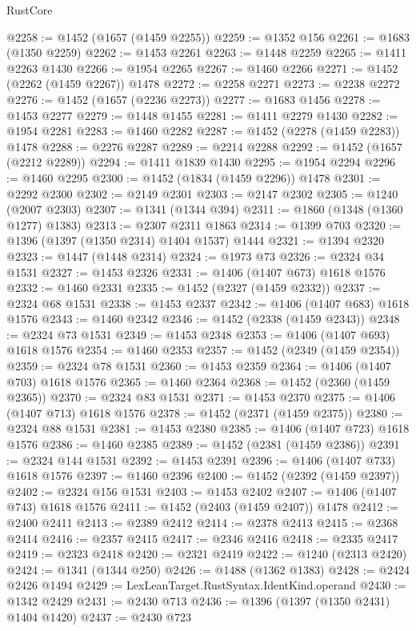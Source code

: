 \begin{lexlean}{RustCore}
\begin{coremodule}
{\begin{coremodule}
{{{{{{{{{{{{{{{{{{{{{{{{{{{{{{{{{{{{{{{{{{{{{@2258 := @1452 (@1657 (@1459 @2255))
@2259 := @1352 @156
@2261 := @1683 (@1350 @2259)
@2262 := @1453 @2261
@2263 := @1448 @2259
@2265 := @1411 @2263 @1430
@2266 := @1954 @2265
@2267 := @1460 @2266
@2271 := @1452 (@2262 (@1459 @2267)) @1478
@2272 := @2258 @2271
@2273 := @2238 @2272
@2276 := @1452 (@1657 (@2236 @2273))
@2277 := @1683 @1456
@2278 := @1453 @2277
@2279 := @1448 @1455
@2281 := @1411 @2279 @1430
@2282 := @1954 @2281
@2283 := @1460 @2282
@2287 := @1452 (@2278 (@1459 @2283)) @1478
@2288 := @2276 @2287
@2289 := @2214 @2288
@2292 := @1452 (@1657 (@2212 @2289))
@2294 := @1411 @1839 @1430
@2295 := @1954 @2294
@2296 := @1460 @2295
@2300 := @1452 (@1834 (@1459 @2296)) @1478
@2301 := @2292 @2300
@2302 := @2149 @2301
@2303 := @2147 @2302
@2305 := @1240 (@2007 @2303)
@2307 := @1341 (@1344 @394)
@2311 := @1860 (@1348 (@1360 @1277) @1383)
@2313 := @2307 @2311 @1863
@2314 := @1399 @703
@2320 := @1396 (@1397 (@1350 @2314) @1404 @1537) @1444
@2321 := @1394 @2320
@2323 := @1447 (@1448 @2314)
@2324 := @1973 @73
@2326 := @2324 @34 @1531
@2327 := @1453 @2326
@2331 := @1406 (@1407 @673) @1618 @1576
@2332 := @1460 @2331
@2335 := @1452 (@2327 (@1459 @2332))
@2337 := @2324 @68 @1531
@2338 := @1453 @2337
@2342 := @1406 (@1407 @683) @1618 @1576
@2343 := @1460 @2342
@2346 := @1452 (@2338 (@1459 @2343))
@2348 := @2324 @73 @1531
@2349 := @1453 @2348
@2353 := @1406 (@1407 @693) @1618 @1576
@2354 := @1460 @2353
@2357 := @1452 (@2349 (@1459 @2354))
@2359 := @2324 @78 @1531
@2360 := @1453 @2359
@2364 := @1406 (@1407 @703) @1618 @1576
@2365 := @1460 @2364
@2368 := @1452 (@2360 (@1459 @2365))
@2370 := @2324 @83 @1531
@2371 := @1453 @2370
@2375 := @1406 (@1407 @713) @1618 @1576
@2378 := @1452 (@2371 (@1459 @2375))
@2380 := @2324 @88 @1531
@2381 := @1453 @2380
@2385 := @1406 (@1407 @723) @1618 @1576
@2386 := @1460 @2385
@2389 := @1452 (@2381 (@1459 @2386))
@2391 := @2324 @144 @1531
@2392 := @1453 @2391
@2396 := @1406 (@1407 @733) @1618 @1576
@2397 := @1460 @2396
@2400 := @1452 (@2392 (@1459 @2397))
@2402 := @2324 @156 @1531
@2403 := @1453 @2402
@2407 := @1406 (@1407 @743) @1618 @1576
@2411 := @1452 (@2403 (@1459 @2407)) @1478
@2412 := @2400 @2411
@2413 := @2389 @2412
@2414 := @2378 @2413
@2415 := @2368 @2414
@2416 := @2357 @2415
@2417 := @2346 @2416
@2418 := @2335 @2417
@2419 := @2323 @2418
@2420 := @2321 @2419
@2422 := @1240 (@2313 @2420)
@2424 := @1341 (@1344 @250)
@2426 := @1488 (@1362 @1383)
@2428 := @2424 @2426 @1494
@2429 := LexLeanTarget.RustSyntax.IdentKind.operand
@2430 := @1342 @2429
@2431 := @2430 @713
@2436 := @1396 (@1397 (@1350 @2431) @1404 @1420)
@2437 := @2430 @723
}}}}}}}}}}}}}}}}}}}}}}}}}}}}}}}}}}}}}}}}}}}}}
\end{coremodule}}
\end{coremodule}
\end{lexlean}
